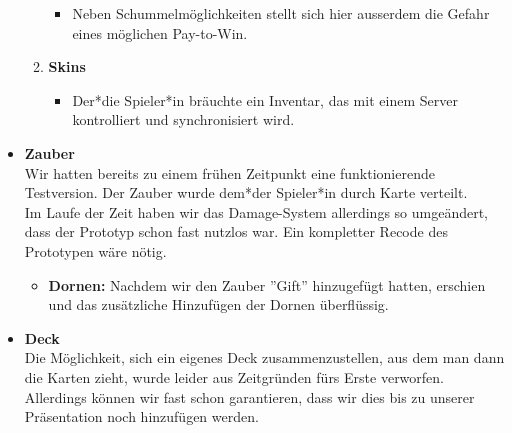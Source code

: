 \begin{itemize}
\begin{enumerate}
        \begin{itemize}
            \item Neben Schummelmöglichkeiten stellt sich hier ausserdem die Gefahr eines möglichen Pay-to-Win.
        \end{itemize}
        \item \textbf{Skins}
        \begin{itemize}
            \item Der*die Spieler*in bräuchte ein Inventar, das mit einem Server kontrolliert und synchronisiert wird. 
        \end{itemize}
    \end{enumerate}
    \item \textbf{Zauber} \\
        Wir hatten bereits zu einem frühen Zeitpunkt eine funktionierende Testversion. Der Zauber wurde dem*der Spieler*in durch Karte verteilt. \\
        Im Laufe der Zeit haben wir das Damage-System allerdings so umgeändert, dass der Prototyp schon fast nutzlos war. Ein kompletter Recode des Prototypen wäre nötig.
    \begin{itemize}
        \item \textbf{Dornen:}
            Nachdem wir den Zauber ''Gift'' hinzugefügt hatten, erschien und das zusätzliche Hinzufügen der Dornen überflüssig.
    \end{itemize}
    \item \textbf{Deck} \\
        Die Möglichkeit, sich ein eigenes Deck zusammenzustellen, aus dem man dann die Karten zieht, wurde leider aus Zeitgründen fürs Erste verworfen. Allerdings können wir
        fast schon garantieren, dass wir dies bis zu unserer Präsentation noch hinzufügen werden.     
\end{itemize}